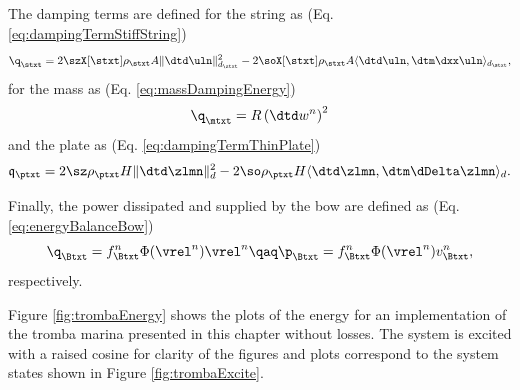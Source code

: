 The damping terms are defined for the string as (Eq. \eqref{eq:dampingTermStiffString})
\begin{equation*}
    \q_\stxt = 2\szX[\stxt] \rho_\stxt A \lVert\dtd\uln\rVert_{d_\stxt}^2 - 2 \soX[\stxt] \rho_\stxt A \langle \dtd \uln, \dtm \dxx \uln \rangle_{d_\stxt},
\end{equation*}  
for the mass as (Eq. \eqref{eq:massDampingEnergy})
\begin{equation*}
    \q_\mtxt = R\left(\dtd w^n \right)^2
\end{equation*}
and the plate as (Eq. \eqref{eq:dampingTermThinPlate})
\begin{equation*}
    \mathfrak{q}_\ptxt = 2\sz \rho_\ptxt H \lVert\dtd\zlmn\rVert_d^2 - 2 \so \rho_\ptxt H \langle \dtd \zlmn, \dtm \dDelta\zlmn \rangle_d.
\end{equation*}

Finally, the power dissipated and supplied by the bow are defined as (Eq. \eqref{eq:energyBalanceBow})
\begin{equation*}
    \q_\Btxt =  f_\Btxt^n \Phi(\vrel^n) \vrel^n \qaq \p_\Btxt = f_\Btxt^n \Phi(\vrel^n)v_\Btxt^n,
\end{equation*}
respectively. 

Figure \ref{fig:trombaEnergy} shows the plots of the energy for an implementation of the tromba marina presented in this chapter without losses. The system is excited with a raised cosine for clarity of the figures and plots correspond to the system states shown in Figure \ref{fig:trombaExcite}.

    

